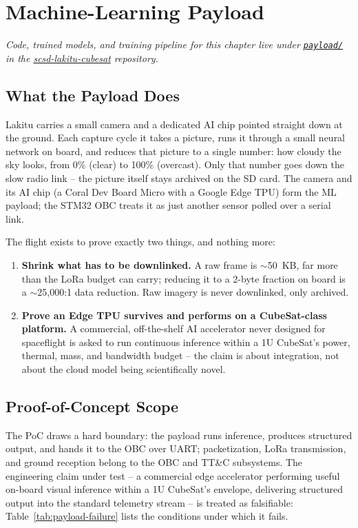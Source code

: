 \chapter{Machine-Learning Payload}

\textit{Code, trained models, and training pipeline for this chapter live
under \href{\repourl/tree/main/payload}{\texttt{payload/}} in the
\href{\repourl}{scsd-lakitu-cubesat} repository.}

\section{What the Payload Does}

Lakitu carries a small camera and a dedicated AI chip pointed straight down
at the ground. Each capture cycle it takes a picture, runs it through a
small neural network on board, and reduces that picture to a single number:
how cloudy the sky looks, from 0\% (clear) to 100\% (overcast). Only that
number goes down the slow radio link -- the picture itself stays archived on
the SD card. The camera and its AI chip (a Coral Dev Board Micro with a
Google Edge TPU) form the ML payload; the STM32 OBC treats it as just
another sensor polled over a serial link.

The flight exists to prove exactly two things, and nothing more:

\begin{enumerate}
  \item \textbf{Shrink what has to be downlinked.} A raw frame is
  $\sim$50~KB, far more than the LoRa budget can carry; reducing it to a
  2-byte fraction on board is a $\sim$25{,}000:1 data reduction. Raw imagery
  is never downlinked, only archived.
  \item \textbf{Prove an Edge TPU survives and performs on a CubeSat-class
  platform.} A commercial, off-the-shelf AI accelerator never designed for
  spaceflight is asked to run continuous inference within a 1U CubeSat's
  power, thermal, mass, and bandwidth budget -- the claim is about
  integration, not about the cloud model being scientifically novel.
\end{enumerate}

\section{Proof-of-Concept Scope}

The PoC draws a hard boundary: the payload runs inference, produces
structured output, and hands it to the OBC over UART; packetization, LoRa
transmission, and ground reception belong to the OBC and TT\&C subsystems.
The engineering claim under test -- a commercial edge accelerator performing
useful on-board visual inference within a 1U CubeSat's envelope, delivering
structured output into the standard telemetry stream -- is treated as
falsifiable: Table~\ref{tab:payload-failure} lists the conditions under
which it fails.

